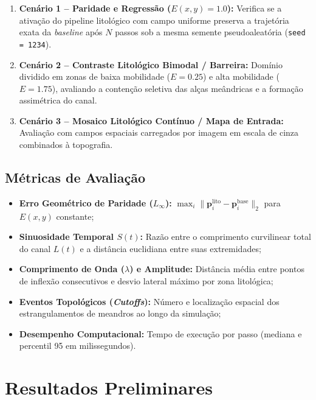 \documentclass[10pt,twocolumn,a4paper]{article}
\begin{document}
\begin{enumerate}
    \item \textbf{Cenário 1 -- Paridade e Regressão ($E(x,y) = 1.0$):} Verifica se a ativação do pipeline litológico com campo uniforme preserva a trajetória exata da \textit{baseline} após $N$ passos sob a mesma semente pseudoaleatória (\texttt{seed = 1234}).
    \item \textbf{Cenário 2 -- Contraste Litológico Bimodal / Barreira:} Domínio dividido em zonas de baixa mobilidade ($E = 0.25$) e alta mobilidade ($E = 1.75$), avaliando a contenção seletiva das alças meândricas e a formação assimétrica do canal.
    \item \textbf{Cenário 3 -- Mosaico Litológico Contínuo / Mapa de Entrada:} Avaliação com campos espaciais carregados por imagem em escala de cinza combinados à topografia.
\end{enumerate}

\subsection{Métricas de Avaliação}
\begin{itemize}
    \item \textbf{Erro Geométrico de Paridade ($L_\infty$):} $\max_i \|\mathbf{p}_i^{\text{lito}} - \mathbf{p}_i^{\text{base}}\|_2$ para $E(x,y)$ constante;
    \item \textbf{Sinuosidade Temporal $S(t)$:} Razão entre o comprimento curvilinear total do canal $L(t)$ e a distância euclidiana entre suas extremidades;
    \item \textbf{Comprimento de Onda ($\lambda$) e Amplitude:} Distância média entre pontos de inflexão consecutivos e desvio lateral máximo por zona litológica;
    \item \textbf{Eventos Topológicos (\textit{Cutoffs}):} Número e localização espacial dos estrangulamentos de meandros ao longo da simulação;
    \item \textbf{Desempenho Computacional:} Tempo de execução por passo (mediana e percentil 95 em milissegundos).
\end{itemize}

\section{Resultados Preliminares}
\label{sec:resultados}
\end{document}
